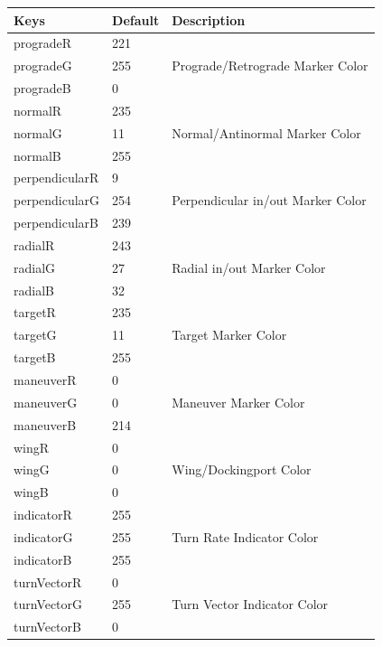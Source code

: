 \documentclass[paper=a4, 11 pt]{report}
\begin{document}
\renewcommand{\arraystretch}{1}
\begin{center}
\begin{tabular}{ |l  l  l| }
  \hline
  \textbf{Keys} & \textbf{Default} & \textbf{Description} \\ \hline
   progradeR & 221 & \multirow{3}{*}{Prograde/Retrograde Marker Color} \\
   progradeG & 255 &  \\
   progradeB & 0 &  \\ \hline
   normalR & 235 & \multirow{3}{*}{Normal/Antinormal Marker Color} \\
   normalG & 11 &  \\
   normalB & 255 &  \\ \hline
   perpendicularR & 9 & \multirow{3}{*}{Perpendicular in/out Marker Color} \\
   perpendicularG & 254 &  \\
   perpendicularB & 239 &  \\ \hline
   radialR & 243 & \multirow{3}{*}{Radial in/out Marker Color} \\
   radialG & 27 &  \\
   radialB & 32 &  \\ \hline
   targetR & 235 & \multirow{3}{*}{Target Marker Color} \\
   targetG & 11 &  \\
   targetB & 255 &  \\ \hline
   maneuverR & 0 & \multirow{3}{*}{Maneuver Marker Color} \\
   maneuverG & 0 &  \\
   maneuverB & 214 &  \\ \hline
   wingR & 0 & \multirow{3}{*}{Wing/Dockingport Color} \\
   wingG & 0 &  \\
   wingB & 0 &  \\ \hline
   indicatorR & 255 & \multirow{3}{*}{Turn Rate Indicator Color} \\
   indicatorG & 255 &  \\
   indicatorB & 255 &  \\ \hline
   turnVectorR & 0 & \multirow{3}{*}{Turn Vector Indicator Color} \\
   turnVectorG & 255 &  \\
   turnVectorB & 0 &  \\ \hline
\end{tabular}
\end{center}

\clearpage
\end{document}
